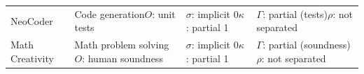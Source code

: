 \documentclass{clv2025}
\begin{document}
\begin{table}[t]
\begin{tabularx}{0.99\linewidth}{@{}P{0.22\textwidth}P{0.28\textwidth}P{0.18\textwidth}Y@{}}
NeoCoder \citep{lu_benchmarking_2025} & Code generation\newline $O$: unit tests & $\sigma$: implicit 0\newline $\kappa$: partial 1 & $\Gamma$: partial (tests)\newline $\rho$: not separated\\
Math Creativity \citep{ye_assessing_2024} & Math problem solving\newline $O$: human soundness & $\sigma$: implicit 0\newline $\kappa$: partial 1 & $\Gamma$: partial (soundness)\newline $\rho$: not separated\\
\bottomrule
\end{tabularx}
\end{table}

\clearpage

\end{document}
